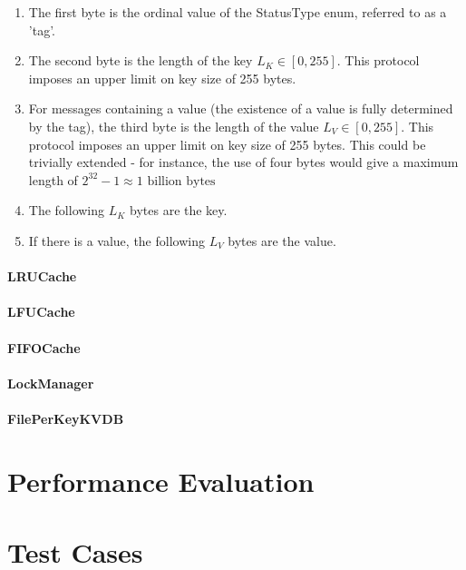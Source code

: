 \documentclass[12pt]{article}
\begin{document}
\begin{multicols}{2}
\begin{enumerate}
\item The first byte is the ordinal value of the StatusType enum, referred to as a 'tag'.
\item The second byte is the length of the key $L_K \in [0, 255]$. This protocol imposes an upper limit on key size of 255 bytes.
\item For messages containing a value (the existence of a value is fully determined by the tag), the third byte is the length of the value $L_V \in [0, 255]$. This protocol imposes an upper limit on key size of 255 bytes. This could be trivially extended - for instance, the use of four bytes would give a maximum length of $2^32-1\approx 1 \text{ billion bytes}$
\item The following $L_K$ bytes are the key.
\item If there is a value, the following $L_V$ bytes are the value.
\end{enumerate}

\paragraph{LRUCache}

\paragraph{LFUCache}

\paragraph{FIFOCache}

\paragraph{LockManager}

\paragraph{FilePerKeyKVDB}


\section{Performance Evaluation}


\section{Test Cases}


\end{multicols}
\end{document}
